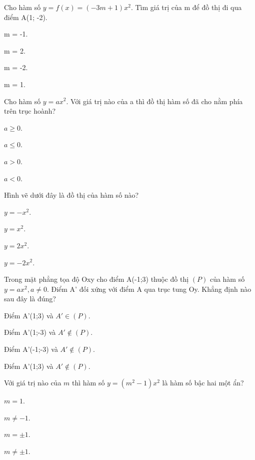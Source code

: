 \documentclass[%
    fontsize=12pt,%
    chapterprefix=false,%
    open=right,%
    twoside=false,%
    numbers=noenddot,%
    headings=optiontohead,%
    final,%
    DIV=15,%
    parskip=half %
]{scrbook}
\begin{document}
\begin{tracnghiem}

\item Cho hàm số $ y = f(x) = (-3m + 1)x^2 $. Tìm giá trị của m để đồ thị đi qua điểm A(1; -2).
\begin{options}
  \item m = -1.
  \item m = 2.
  \item m = -2.
  \item m = 1.
\end{options}

\item Cho hàm số $ y = ax^2 $. Với giá trị nào của a thì đồ thị hàm số đã cho nằm phía trên trục hoành?
\begin{options}
  \item $ a \geq 0 $.
  \item $ a \leq 0 $.
  \item $ a > 0 $.
  \item $ a < 0 $.
\end{options}

\item Hình vẽ dưới đây là đồ thị của hàm số nào?
\begin{options}
  \item $ y = -x^2 $.
  \item $ y = x^2 $.
  \item $ y = 2x^2 $.
  \item $ y = -2x^2 $.
\end{options}

\item Trong mặt phẳng tọa độ Oxy cho điểm A(-1;3) thuộc đồ thị $(P)$ của hàm số $ y = ax^2, a \neq 0 $. Điểm A' đối xứng với điểm A qua trục tung Oy. Khẳng định nào sau đây là đúng?
\begin{options}
  \item Điểm A'(1;3) và $ A' \in (P) $.
  \item Điểm A'(1;-3) và $ A' \notin (P) $.
  \item Điểm A'(-1;-3) và $ A' \notin (P) $.
  \item Điểm A'(1;3) và $ A' \notin (P) $.
\end{options}

\item Với giá trị nào của $ m $ thì hàm số $ y = (m^2 - 1)x^2 $ là hàm số bậc hai một ẩn?
\begin{options}
  \item $ m = 1 $.
  \item $ m \neq -1 $.
  \item $ m = \pm 1 $.
  \item $ m \neq \pm 1 $.
\end{options}


\end{tracnghiem}
\end{document}
